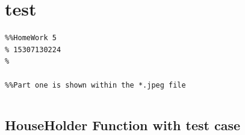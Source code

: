 \documentclass[10pt]{article}
\begin{document}
{\Huge\section*{test}}

\tableofcontents
\vspace*{4em}

\begin{lstlisting}
%%HomeWork 5
% 15307130224
%

%%Part one is shown within the *.jpeg file
\end{lstlisting}
\begin{lstlisting}[language={},xleftmargin=5pt,frame=none]

\end{lstlisting}


{}
\subsection*{HouseHolder Function with test case}
\end{document}
